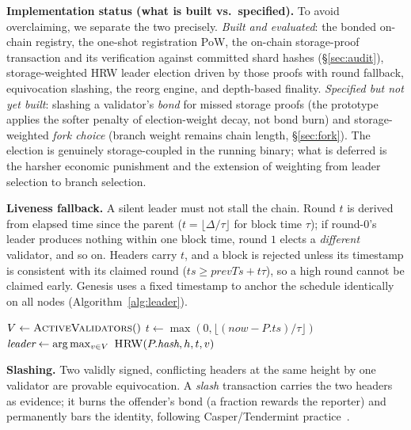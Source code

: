 \textbf{Implementation status (what is built vs.\ specified).} To avoid overclaiming, we separate
the two precisely. \emph{Built and evaluated}: the bonded on-chain registry, the one-shot
registration PoW, the on-chain storage-proof transaction and its verification against committed
shard hashes (\S\ref{sec:audit}), storage-weighted HRW leader election driven by those proofs with
round fallback, equivocation slashing, the reorg engine, and depth-based finality. \emph{Specified
but not yet built}: slashing a validator's \emph{bond} for missed storage proofs (the prototype
applies the softer penalty of election-weight decay, not bond burn) and storage-weighted
\emph{fork choice} (branch weight remains chain length, \S\ref{sec:fork}). The election is genuinely
storage-coupled in the running binary; what is deferred is the harsher economic punishment and the
extension of weighting from leader selection to branch selection.

\textbf{Liveness fallback.} A silent leader must not stall the chain. Round $t$ is derived from
elapsed time since the parent ($t=\lfloor\Delta/\tau\rfloor$ for block time $\tau$); if round-0's
leader produces nothing within one block time, round $1$ elects a \emph{different} validator,
and so on. Headers carry $t$, and a block is rejected unless its timestamp is consistent with
its claimed round ($\textit{ts}\ge \textit{prevTs}+t\tau$), so a high round cannot be claimed
early. Genesis uses a fixed timestamp to anchor the schedule identically on all nodes
(Algorithm~\ref{alg:leader}).

\begin{algorithm}[t]
\SetAlgoLined\DontPrintSemicolon
{}
$V \leftarrow \textsc{ActiveValidators}()$ 
$t \leftarrow \max(0,\lfloor(\textit{now}-P.\textit{ts})/\tau\rfloor)$ 
$\textit{leader} \leftarrow \arg\max_{v\in V}\ \textsc{HRW}(P.\textit{hash},h,t,v)$\;
\caption{Proof-of-Storage leader election with round fallback (run each tick).}
\label{alg:leader}
\end{algorithm}

\textbf{Slashing.} Two validly signed, conflicting headers at the same height by one validator
are provable equivocation. A \emph{slash} transaction carries the two headers as evidence; it
burns the offender's bond (a fraction rewards the reporter) and permanently bars the identity,
following Casper/Tendermint practice~\cite{buterin2017casper,buchman2018gossip}.
